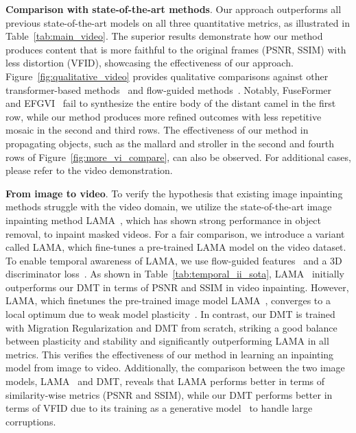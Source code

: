 \documentclass[10pt,twocolumn,letterpaper]{article}
\begin{document}
\noindent
\textbf{Comparison with state-of-the-art methods}. Our approach outperforms all previous state-of-the-art models on all three quantitative metrics, as illustrated in Table~\ref{tab:main_video}. The superior results demonstrate how our method produces content that is more faithful to the original frames (PSNR, SSIM) with less distortion (VFID), showcasing the effectiveness of our approach. Figure~\ref{fig:qualitative_video} provides qualitative comparisons against other transformer-based methods~\cite{liu21fuseformer,li22e2fgvi} and flow-guided methods~\cite{li22e2fgvi,zhang22flow}. Notably, FuseFormer~\cite{liu21fuseformer} and EFGVI~\cite{li22e2fgvi} fail to synthesize the entire body of the distant camel in the first row, while our method produces more refined outcomes with less repetitive mosaic in the second and third rows. The effectiveness of our method in propagating objects, such as the mallard and stroller in the second and fourth rows of Figure~\ref{fig:more_vi_compare}, can also be observed. For additional cases, please refer to the video demonstration.

\noindent
\textbf{From image to video}. To verify the hypothesis that existing image inpainting methods struggle with the video domain, we utilize the state-of-the-art image inpainting method LAMA~\cite{suvorov22lama}, which has shown strong performance in object removal, to inpaint masked videos. For a fair comparison, we introduce a variant called LAMA, which fine-tunes a pre-trained LAMA model on the video dataset. To enable temporal awareness of LAMA, we use flow-guided features~\cite{li22e2fgvi} and a 3D discriminator loss~\cite{zeng20sttn}. As shown in Table~\ref{tab:temporal_ii_sota}, LAMA~\cite{suvorov22lama} initially outperforms our DMT in terms of PSNR and SSIM in video inpainting. However, LAMA, which finetunes the pre-trained image model LAMA~\cite{suvorov22lama}, converges to a local optimum due to weak model plasticity~\cite{mermillod2013stability}. In contrast, our DMT is trained with Migration Regularization and DMT from scratch, striking a good balance between plasticity and stability and significantly outperforming LAMA in all metrics. This verifies the effectiveness of our method in learning an inpainting model from image to video. Additionally, the comparison between the two image models, LAMA~\cite{suvorov22lama} and DMT, reveals that LAMA performs better in terms of similarity-wise metrics (PSNR and SSIM), while our DMT performs better in terms of VFID due to its training as a generative model~\cite{li22mat,zhao21comod} to handle large corruptions.
\end{document}
